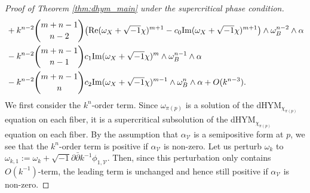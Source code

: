 \documentclass{amsart}
\numberwithin{equation}{section}
\theoremstyle{plain}
\theoremstyle{definition}
\theoremstyle{remark}
\begin{document}
\begin{proof}[Proof of Theorem \ref{thm:dhym_main} under the supercritical phase condition]
\begin{align*}
        &+k^{n-2}{{m+n-1}\choose n-2} \big(\mathrm{Re}(\omega_X+\sqrt{-1}\chi)^{m+1}-c_0\mathrm{Im}(\omega_X+\sqrt{-1}\chi)^{m+1}\big)\wedge\omega_B^{n-2}\wedge\alpha\notag\\
        &-k^{n-2} {{m+n-1}\choose n-1} c_1\mathrm{Im}(\omega_X+\sqrt{-1}\chi)^m\wedge\omega_B^{n-1}\wedge\alpha\notag\\
        &-k^{n-2}{{m+n-1}\choose n} c_2\mathrm{Im}(\omega_X+\sqrt{-1}\chi)^{m-1}\wedge\omega_B^{n}\wedge\alpha+O(k^{n-3})\notag.
    \end{align*}
    We first consider the $k^n$-order term. Since $\omega_{\pi(p)}$ is a solution of the dHYM$_{\chi_{\pi(p)}}$ equation on each fiber, it is a supercritical subsolution of the dHYM$_{\chi_{\pi(p)}}$ equation on each fiber. By the assumption that $\alpha_{\mathcal{V}}$ is a semipositive form at $p$, we see that the $k^n$-order term is positive if $\alpha_{\mathcal{V}}$ is non-zero. Let us perturb $\omega_{k}$ to $\omega_{k,1}:=\omega_k+\sqrt{-1}\partial\bar{\partial}k^{-1}\phi_{1,\mathcal{V}}$. Then, since this perturbation only contains $O(k^{-1})$-term, the leading term is unchanged and hence still positive if $\alpha_{\mathcal{V}}$ is non-zero. 
    

\end{proof}
\end{document}
